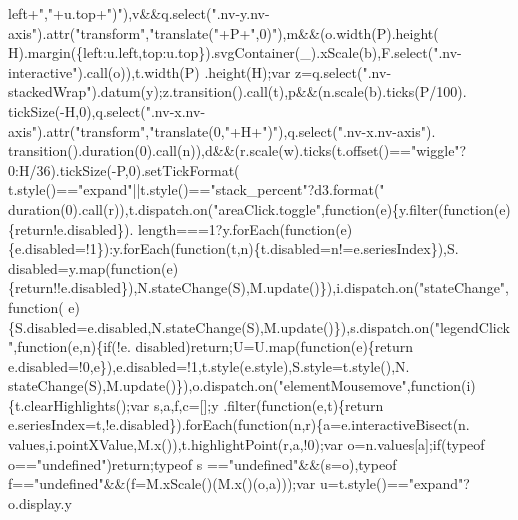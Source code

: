 \begin{DoxyCode}
{      left+\textcolor{stringliteral}{","}+u.top+\textcolor{stringliteral}{")"}),v&&q.select(\textcolor{stringliteral}{".nv-y.nv-axis"}).attr(\textcolor{stringliteral}{"transform"},\textcolor{stringliteral}{"translate("}+P+\textcolor{stringliteral}{",0)"}),m&&(o.width(P).height(
      H).margin(\{left:u.left,top:u.top\}).svgContainer(\_).xScale(b),F.select(\textcolor{stringliteral}{".nv-interactive"}).call(o)),t.width(P)
      .height(H);var z=q.select(\textcolor{stringliteral}{".nv-stackedWrap"}).datum(y);z.transition().call(t),p&&(n.scale(b).ticks(P/100).
      tickSize(-H,0),q.select(\textcolor{stringliteral}{".nv-x.nv-axis"}).attr(\textcolor{stringliteral}{"transform"},\textcolor{stringliteral}{"translate(0,"}+H+\textcolor{stringliteral}{")"}),q.select(\textcolor{stringliteral}{".nv-x.nv-axis"}).
      transition().duration(0).call(n)),d&&(r.scale(w).ticks(t.offset()==\textcolor{stringliteral}{"wiggle"}?0:H/36).tickSize(-P,0).setTickFormat(
      t.style()==\textcolor{stringliteral}{"expand"}||t.style()==\textcolor{stringliteral}{"stack\_percent"}?d3.format(\textcolor{stringliteral}{"%
      duration(0).call(r)),t.dispatch.on(\textcolor{stringliteral}{"areaClick.toggle"},\textcolor{keyword}{function}(e)\{y.filter(function(e)\{return!e.disabled\}).
      length===1?y.forEach(\textcolor{keyword}{function}(e)\{e.disabled=!1\}):y.forEach(\textcolor{keyword}{function}(t,n)\{t.disabled=n!=e.seriesIndex\}),S.
      disabled=y.map(\textcolor{keyword}{function}(e)\{\textcolor{keywordflow}{return}!!e.disabled\}),N.stateChange(S),M.update()\}),i.dispatch.on(\textcolor{stringliteral}{"stateChange"},\textcolor{keyword}{function}(
      e)\{S.disabled=e.disabled,N.stateChange(S),M.update()\}),s.dispatch.on(\textcolor{stringliteral}{"legendClick"},\textcolor{keyword}{function}(e,n)\{\textcolor{keywordflow}{if}(!e.
      disabled)\textcolor{keywordflow}{return};U=U.map(\textcolor{keyword}{function}(e)\{return e.disabled=!0,e\}),e.disabled=!1,t.style(e.style),S.style=t.style(),N.
      stateChange(S),M.update()\}),o.dispatch.on(\textcolor{stringliteral}{"elementMousemove"},\textcolor{keyword}{function}(i)\{t.clearHighlights();var s,a,f,c=[];y
      .filter(function(e,t)\{return e.seriesIndex=t,!e.disabled\}).forEach(\textcolor{keyword}{function}(n,r)\{a=e.interactiveBisect(n.
      values,i.pointXValue,M.x()),t.highlightPoint(r,a,!0);var o=n.values[a];\textcolor{keywordflow}{if}(typeof o==\textcolor{stringliteral}{"undefined"})\textcolor{keywordflow}{return};typeof s
      ==\textcolor{stringliteral}{"undefined"}&&(s=o),typeof f==\textcolor{stringliteral}{"undefined"}&&(f=M.xScale()(M.x()(o,a)));var u=t.style()==\textcolor{stringliteral}{"expand"}?o.display.y
}}
\end{DoxyCode}
